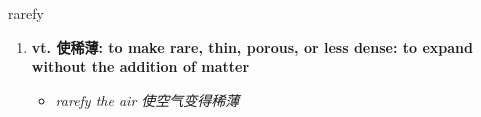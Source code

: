
\begin{frame}
{\huge rarefy}
\begin{center}
\begin{enumerate}\Large
  \item \textbf{vt. 使稀薄: to make rare, thin, porous, or less dense: to expand without the addition of matter}
  \begin{itemize}
    \item \em{\Large{rarefy the air 使空气变得稀薄}}
  \end{itemize}
\end{enumerate}
\end{center}
\end{frame}

